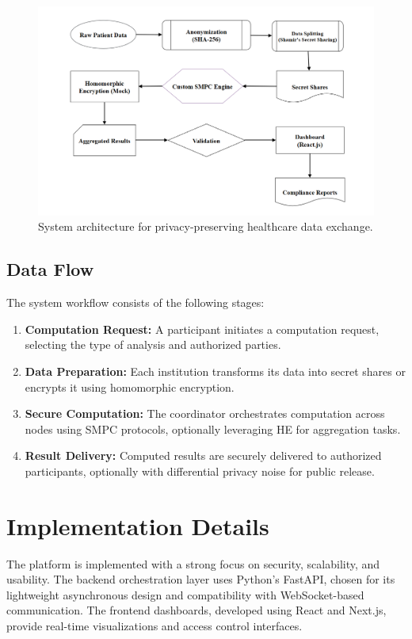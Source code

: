 \documentclass[conference]{IEEEtran}
\begin{document}
\begin{figure}[H]
    \centering
    \includegraphics[width=\linewidth]{architecture.png}
    \caption{System architecture for privacy-preserving healthcare data exchange.}
    \label{fig:architecture}
\end{figure}

\subsection{Data Flow}
The system workflow consists of the following stages:
\begin{enumerate}
    \item \textbf{Computation Request:} A participant initiates a computation request, selecting the type of analysis and authorized parties.
    \item \textbf{Data Preparation:} Each institution transforms its data into secret shares or encrypts it using homomorphic encryption.
    \item \textbf{Secure Computation:} The coordinator orchestrates computation across nodes using SMPC protocols, optionally leveraging HE for aggregation tasks.
    \item \textbf{Result Delivery:} Computed results are securely delivered to authorized participants, optionally with differential privacy noise for public release.
\end{enumerate}

\section{Implementation Details}
The platform is implemented with a strong focus on security, scalability, and usability. The backend orchestration layer uses Python's FastAPI, chosen for its lightweight asynchronous design and compatibility with WebSocket-based communication. The frontend dashboards, developed using React and Next.js, provide real-time visualizations and access control interfaces.
\end{document}
